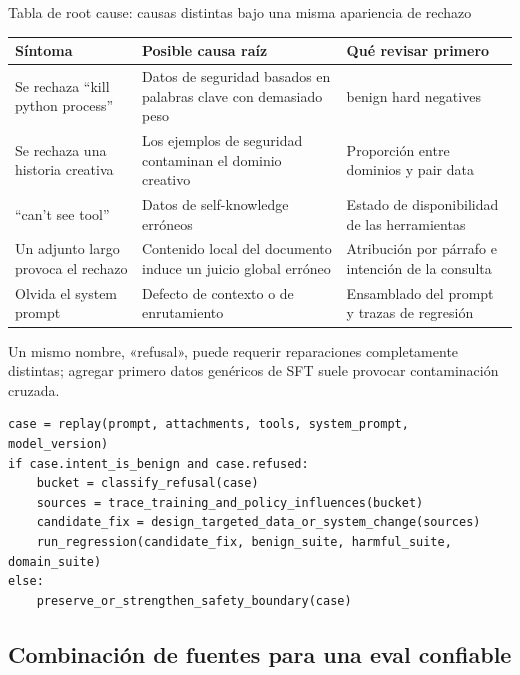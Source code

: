 \documentclass[a4paper]{article}
\begin{document}
\begin{knowledgebox}{Tabla de root cause: causas distintas bajo una misma apariencia de rechazo}
\begin{tabularx}{\textwidth}{L{0.22\textwidth} X X}
\toprule
Síntoma & Posible causa raíz & Qué revisar primero \\
\midrule
Se rechaza ``kill python process'' & Datos de seguridad basados en palabras clave con demasiado peso & benign hard negatives \\
Se rechaza una historia creativa & Los ejemplos de seguridad contaminan el dominio creativo & Proporción entre dominios y pair data \\
``can't see tool'' & Datos de self-knowledge erróneos & Estado de disponibilidad de las herramientas \\
Un adjunto largo provoca el rechazo & Contenido local del documento induce un juicio global erróneo & Atribución por párrafo e intención de la consulta \\
Olvida el system prompt & Defecto de contexto o de enrutamiento & Ensamblado del prompt y trazas de regresión \\
\bottomrule
\end{tabularx}
Un mismo nombre, «refusal», puede requerir reparaciones completamente distintas; agregar primero datos genéricos de SFT suele provocar contaminación cruzada.
\end{knowledgebox}

\begin{lstlisting}[caption={Flujo mínimo de triaje para fallas de rechazo}]
case = replay(prompt, attachments, tools, system_prompt, model_version)
if case.intent_is_benign and case.refused:
    bucket = classify_refusal(case)
    sources = trace_training_and_policy_influences(bucket)
    candidate_fix = design_targeted_data_or_system_change(sources)
    run_regression(candidate_fix, benign_suite, harmful_suite, domain_suite)
else:
    preserve_or_strengthen_safety_boundary(case)
\end{lstlisting}


\subsection{Combinación de fuentes para una eval confiable}
\end{document}
